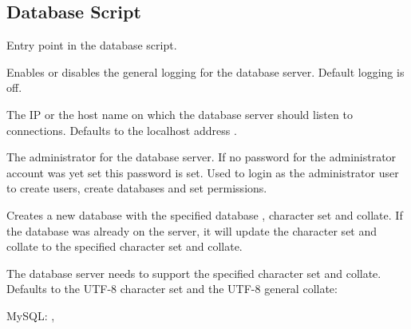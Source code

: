 \subsection{Database Script}



Entry point in the database script.


Enables or disables the general logging for the database server.
Default logging is off.


The IP  or the host name on which the database server should listen
to connections. Defaults to the localhost address .


The administrator  for the database server. If no password for
the administrator account was yet set this password is set. Used to login as
the administrator user to create users, create databases and set permissions.


Creates a new database with the specified database , character set and collate.
If the database was already on the server, it will update the character set and collate
to the specified character set and collate.

The database server needs to support the specified character set and collate.
Defaults to the UTF-8 character set and the UTF-8 general collate:

\begin{compactitem}
\item MySQL: , 
\end{compactitem}


